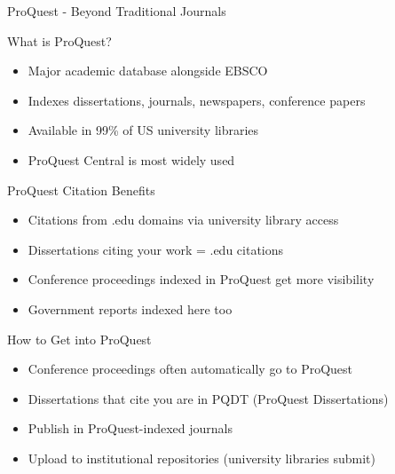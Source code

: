 \documentclass[11pt]{beamer}
\begin{document}
	
	\begin{frame}{ProQuest - Beyond Traditional Journals}
		\scriptsize
		\begin{block}{What is ProQuest?}
			\begin{itemize}
				\item Major academic database alongside EBSCO
				\item Indexes dissertations, journals, newspapers, conference papers
				\item Available in 99\% of US university libraries
				\item ProQuest Central is most widely used
			\end{itemize}
		\end{block}
		\begin{block}{ProQuest Citation Benefits}
			\begin{itemize}
				\item Citations from .edu domains via university library access
				\item Dissertations citing your work = .edu citations
				\item Conference proceedings indexed in ProQuest get more visibility
				\item Government reports indexed here too
			\end{itemize}
		\end{block}
		\begin{block}{How to Get into ProQuest}
			\begin{itemize}
				\item Conference proceedings often automatically go to ProQuest
				\item Dissertations that cite you are in PQDT (ProQuest Dissertations)
				\item Publish in ProQuest-indexed journals
				\item Upload to institutional repositories (university libraries submit)
			\end{itemize}
		\end{block}
	\end{frame}
	
\end{document}
